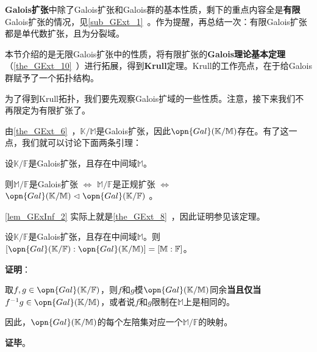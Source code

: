 


\textbf{Galois扩张}中除了Galois扩张和Galois群的基本性质，剩下的重点内容全是\textbf{有限}Galois扩张的情况，见\autoref{sub_GExt_1}~。作为提醒，再总结一次：有限Galois扩张都是单代数扩张，且为分裂域。

本节介绍的是无限Galois扩张中的性质，将有限扩张的\textbf{Galois理论基本定理}（\autoref{the_GExt_10}~）进行拓展，得到\textbf{Krull}定理。Krull的工作亮点，在于给Galois群赋予了一个拓扑结构。


为了得到Krull拓扑，我们要先观察Galois扩域的一些性质。注意，接下来我们不再限定为有限扩张了。


由\autoref{the_GExt_6}~，$\mathbb{K}/\mathbb{M}$是Galois扩张，因此$\opn{Gal}(\mathbb{K}/\mathbb{M})$存在。有了这一点，我们就可以讨论下面两条引理：

\begin{lemma}{}\label{lem_GExInf_2}
设$\mathbb{K}/\mathbb{F}$是Galois扩张，且存在中间域$\mathbb{M}$。

则$\mathbb{M}/\mathbb{F}$是Galois扩张 $\iff$ $\mathbb{M}/\mathbb{F}$是正规扩张 $\iff$ $\opn{Gal}(\mathbb{K}/\mathbb{M})\vartriangleleft \opn{Gal}(\mathbb{K}/\mathbb{F})$ 。
\end{lemma}

\autoref{lem_GExInf_2} 实际上就是\autoref{the_GExt_8}~，因此证明参见该定理。


\begin{lemma}{}\label{lem_GExInf_1}
设$\mathbb{K}/\mathbb{F}$是Galois扩张，且存在中间域$\mathbb{M}$。则$[\opn{Gal}(\mathbb{K}/\mathbb{F}):\opn{Gal}(\mathbb{K}/\mathbb{M})]=[\mathbb{M}:\mathbb{F}]$。


\end{lemma}


\textbf{证明}：

取$f, g\in\opn{Gal}(\mathbb{K}/\mathbb{F})$，则$f$和$g$模$\opn{Gal}(\mathbb{K}/\mathbb{M})$同余\textbf{当且仅当}$f^{-1}g\in\opn{Gal}(\mathbb{K}/\mathbb{M})$，或者说$f$和$g$限制在$\mathbb{M}$上是相同的。

因此，$\opn{Gal}(\mathbb{K}/\mathbb{M})$的每个左陪集对应一个$\mathbb{M}/\mathbb{F}$的映射。

\textbf{证毕}。


